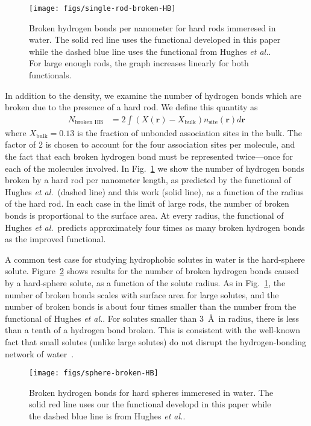 \documentclass[preprint,amsmath,amssymb]{revtex4-1}
\newcommand{\rr}{\textbf{r}}
\newcommand\hughesetal{Hughes \emph{et al.}}
\begin{document}
\begin{figure}
\begin{center}
\texttt{[image: figs/single-rod-broken-HB]}
\end{center}
\caption{Broken hydrogen bonds per nanometer for hard rods
  immeresed in water.  The solid red line uses the functional developed
  in this paper while the dashed blue line uses the functional from
  \hughesetal. For large enough rods, the graph
  increases linearly for both functionals.}
\label{fig:single-rod-broken-HB}
\end{figure}

In addition to the density, we examine the number of hydrogen bonds
which are broken due to the presence of a hard rod.  We define this
quantity as
\begin{align}
  N_{\text{broken HB}} &= 2 \int (X(\rr) - X_{\text{bulk}})n_{\text{site}}(\rr) d\rr
\end{align}
where $X_{\text{bulk}} = 0.13$ is the fraction of unbonded
association sites in the bulk.  The factor of 2 is chosen to account
for the four association sites per molecule, and the fact that each
broken hydrogen bond must be represented twice---once for each of the
molecules involved.  In Fig.~\ref{fig:single-rod-broken-HB} we show
the number of hydrogen bonds broken by a hard rod per nanometer
length, as predicted by the functional of \hughesetal\ (dashed line)
and this work (solid line), as a function of the radius of the hard
rod.  In each case in the limit of large rods, the number of broken
bonds is proportional to the surface area.  At every radius, the
functional of \hughesetal\ predicts approximately four times as many
broken hydrogen bonds as the improved functional.

A common test case for studying hydrophobic solutes in water is the
hard-sphere solute.  Figure~\ref{fig:spheres-broken-HB} shows results
for the number of broken hydrogen bonds caused by a hard-sphere solute,
as a function of the solute radius.  As in
Fig.~\ref{fig:single-rod-broken-HB}, the number of broken bonds scales
with surface area for large solutes, and the number of broken bonds is
about four times smaller than the number from the functional of
\hughesetal.  For solutes smaller than
3~\AA\ in radius, there is less than a tenth of a hydrogen bond
broken. This is consistent with the well-known fact that small solutes
(unlike large solutes) do not disrupt the hydrogen-bonding network of
water~\cite{chandler2005}.

\begin{figure}
\begin{center}
\texttt{[image: figs/sphere-broken-HB]}
\end{center}
\caption{Broken hydrogen bonds for hard spheres immeresed in water.
  The solid red line uses our the functional developd in this paper
  while the dashed blue line is from
  \hughesetal.}
\label{fig:spheres-broken-HB}
\end{figure}
\end{document}
